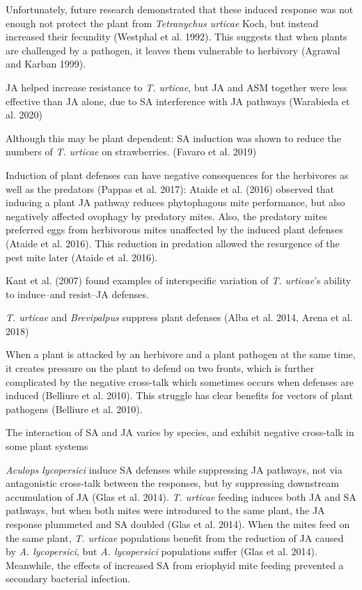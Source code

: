 \documentclass[12pt,final,CPage]{ufthesis}
\begin{document}
{  Unfortunately, future research demonstrated that these induced response was not enough not protect the plant from \emph{Tetranychus urticae} Koch, but instead increased their fecundity (Westphal et al. 1992). This suggests that when plants are challenged by a pathogen, it leaves them vulnerable to herbivory (Agrawal and Karban 1999).

  JA helped increase resistance to \emph{T. urticae}, but JA and ASM together were less effective than JA alone, due to SA interference with JA pathways (Warabieda et al. 2020)

  Although this may be plant dependent: SA induction was shown to reduce the numbers of \emph{T. urticae} on strawberries. (Favaro et al. 2019)

  Induction of plant defenses can have negative consequences for the herbivores as well as the predators (Pappas et al. 2017): Ataide et al. (2016) observed that inducing a plant JA pathway reduces phytophagous mite performance, but also negatively affected ovophagy by predatory mites. Also, the predatory mites preferred eggs from herbivorous mites unaffected by the induced plant defenses (Ataide et al. 2016). This reduction in predation allowed the resurgence of the pest mite later (Ataide et al. 2016).

  Kant et al. (2007) found examples of interspecific variation of \emph{T. urticae}'s ability to induce--and resist--JA defenses.

  \emph{T. urticae} and \emph{Brevipalpus} suppress plant defenses (Alba et al. 2014, Arena et al. 2018)

  When a plant is attacked by an herbivore and a plant pathogen at the same time, it creates pressure on the plant to defend on two fronts, which is further complicated by the negative cross-talk which sometimes occurs when defenses are induced (Belliure et al. 2010). This struggle has clear benefits for vectors of plant pathogens (Belliure et al. 2010).

  The interaction of SA and JA varies by species, and exhibit negative cross-talk in some plant systems

  \emph{Aculops lycopersici} induce SA defenses while suppressing JA pathways, not via antagonistic cross-talk between the responses, but by suppressing downstream accumulation of JA (Glas et al. 2014). \emph{T. urticae} feeding induces both JA and SA pathways, but when both mites were introduced to the same plant, the JA response plummeted and SA doubled (Glas et al. 2014). When the mites feed on the same plant, \emph{T. urticae} populations benefit from the reduction of JA caused by \emph{A. lycopersici}, but \emph{A. lycopersici} populations suffer (Glas et al. 2014). Meanwhile, the effects of increased SA from eriophyid mite feeding prevented a secondary bacterial infection.

}
\end{document}
